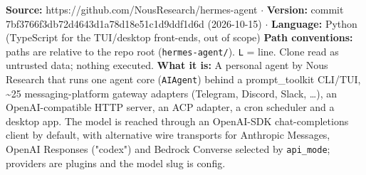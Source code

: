 \textbf{Source:} https://github.com/NousResearch/hermes-agent $\cdot$ \textbf{Version:} commit 7bf3766f3db72d4643d1a78d18e51c1d9ddf1d6d (2026-10-15) $\cdot$ \textbf{Language:} Python (TypeScript for the TUI/desktop front-ends, out of scope)
\textbf{Path conventions:} paths are relative to the repo root (\texttt{hermes-\allowbreak{}agent/\allowbreak{}}). \texttt{L} = line. Clone read as untrusted data; nothing executed.
\textbf{What it is:} A personal agent by Nous Research that runs one agent core (\texttt{AIAgent}) behind a prompt\_toolkit CLI/TUI, \textasciitilde{}25 messaging-platform gateway adapters (Telegram, Discord, Slack, \ldots{}), an OpenAI-compatible HTTP server, an ACP adapter, a cron scheduler and a desktop app. The model is reached through an OpenAI-SDK chat-completions client by default, with alternative wire transports for Anthropic Messages, OpenAI Responses ("codex") and Bedrock Converse selected by \texttt{api\_\allowbreak{}mode}; providers are plugins and the model slug is config.

